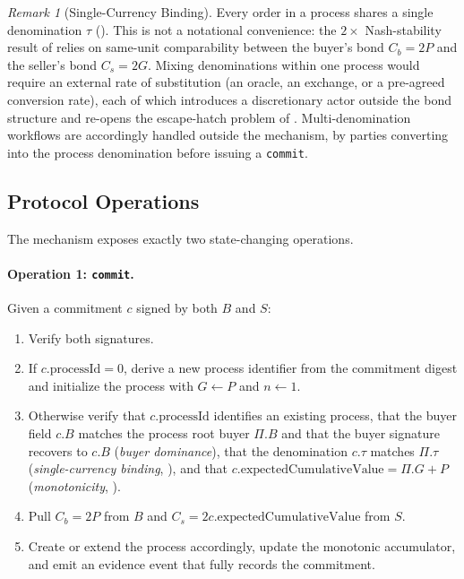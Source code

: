 \documentclass[11pt,a4paper]{article}
\theoremstyle{definition}
\theoremstyle{remark}
\newtheorem{remark}[theorem]{Remark}
\newcommand{\pay}{P}           %
\newcommand{\cumval}{G}        %
\newcommand{\sbond}{C_s}       %
\newcommand{\bbond}{C_b}       %
\begin{document}
\begin{remark}[Single-Currency Binding]
\label{rem:single-currency}
Every order in a process shares a single denomination $\tau$
(). This is not a notational convenience: the
$2\times$ Nash-stability result of 
relies on same-unit comparability between the buyer's bond
$\bbond = 2\pay$ and the seller's bond $\sbond = 2\cumval$.
Mixing denominations within one process would require an external
rate of substitution (an oracle, an exchange, or a pre-agreed
conversion rate), each of which introduces a discretionary actor
outside the bond structure and re-opens the escape-hatch problem
of . Multi-denomination workflows
are accordingly handled outside the mechanism, by parties
converting into the process denomination before issuing a
\texttt{commit}.
\end{remark}

\subsection{Protocol Operations}

The mechanism exposes exactly two state-changing operations.

\paragraph{Operation 1: \texttt{commit}.}
Given a commitment $c$ signed by both $B$ and $S$:
\begin{enumerate}
  \item Verify both signatures.
  \item If $c.\text{processId} = 0$, derive a new process identifier
    from the commitment digest and initialize the process with
    $\cumval \gets \pay$ and $n \gets 1$.
  \item Otherwise verify that $c.\text{processId}$ identifies an
    existing process, that the buyer field $c.B$ matches the process
    root buyer $\Pi.B$ and that the buyer signature recovers to
    $c.B$ (\emph{buyer dominance}), that the denomination
    $c.\tau$ matches $\Pi.\tau$ (\emph{single-currency binding},
    ), and that
    $c.\text{expectedCumulativeValue} = \Pi.\cumval + \pay$
    (\emph{monotonicity}, ).
  \item Pull $\bbond = 2\pay$ from $B$ and
    $\sbond = 2c.\text{expectedCumulativeValue}$ from $S$.
  \item Create or extend the process accordingly, update the monotonic
    accumulator, and emit an evidence event that fully records the
    commitment.
\end{enumerate}
\end{document}
